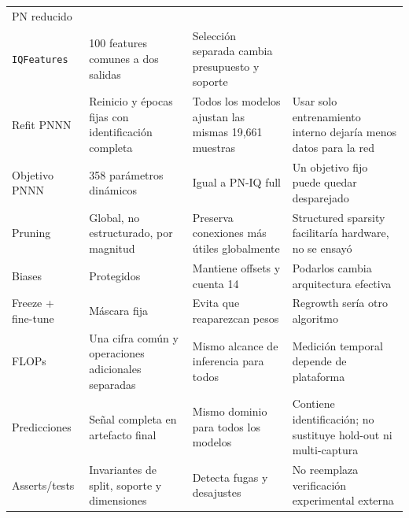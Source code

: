 \documentclass[10pt,a4paper]{article}
\begin{document}
\begin{longtable}{@{}p{.19\linewidth}p{.21\linewidth}p{.25\linewidth}p{.27\linewidth}@{}}
PN reducido & \makecell[l]{\texttt{selectShared}\\\texttt{IQFeatures}} & 100 features comunes a dos salidas & Selección separada cambia presupuesto y soporte\\
Refit PNNN & Reinicio y épocas fijas con identificación completa & Todos los modelos ajustan las mismas 19,661 muestras & Usar solo entrenamiento interno dejaría menos datos para la red\\
Objetivo PNNN & 358 parámetros dinámicos & Igual a PN-IQ full & Un objetivo fijo puede quedar desparejado\\
Pruning & Global, no estructurado, por magnitud & Preserva conexiones más útiles globalmente & Structured sparsity facilitaría hardware, no se ensayó\\
Biases & Protegidos & Mantiene offsets y cuenta 14 & Podarlos cambia arquitectura efectiva\\
Freeze + fine-tune & Máscara fija & Evita que reaparezcan pesos & Regrowth sería otro algoritmo\\
FLOPs & Una cifra común y operaciones adicionales separadas & Mismo alcance de inferencia para todos & Medición temporal depende de plataforma\\
Predicciones & Señal completa en artefacto final & Mismo dominio para todos los modelos & Contiene identificación; no sustituye hold-out ni multi-captura\\
Asserts/tests & Invariantes de split, soporte y dimensiones & Detecta fugas y desajustes & No reemplaza verificación experimental externa\\
\bottomrule
\end{longtable}
\end{document}
